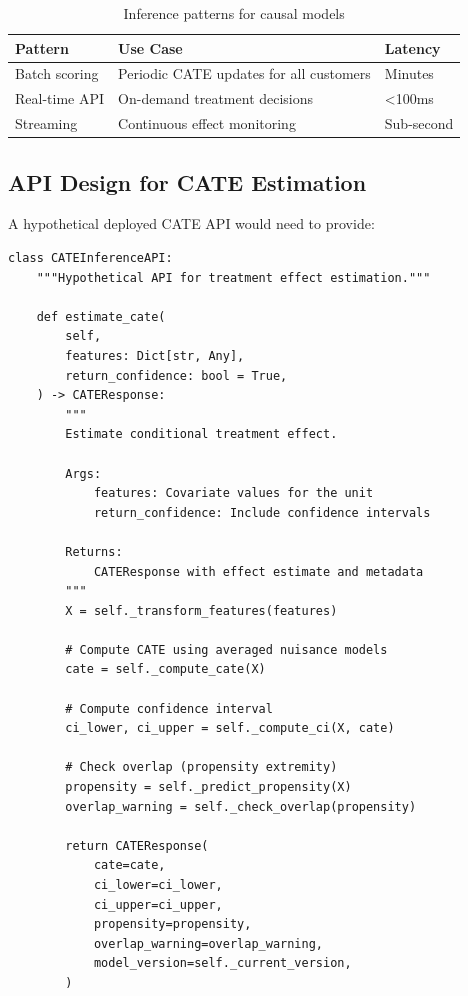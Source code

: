 \begin{table}[htbp]
\centering
\caption{Inference patterns for causal models}
\label{tab:inference_patterns}
\begin{tabular}{lll}
\toprule
\textbf{Pattern} & \textbf{Use Case} & \textbf{Latency} \\
\midrule
Batch scoring & Periodic CATE updates for all customers & Minutes \\
Real-time API & On-demand treatment decisions & <100ms \\
Streaming & Continuous effect monitoring & Sub-second \\
\bottomrule
\end{tabular}
\end{table}

\subsection{API Design for CATE Estimation}

A hypothetical deployed CATE API would need to provide:

\begin{verbatim}
class CATEInferenceAPI:
    """Hypothetical API for treatment effect estimation."""

    def estimate_cate(
        self,
        features: Dict[str, Any],
        return_confidence: bool = True,
    ) -> CATEResponse:
        """
        Estimate conditional treatment effect.

        Args:
            features: Covariate values for the unit
            return_confidence: Include confidence intervals

        Returns:
            CATEResponse with effect estimate and metadata
        """
        X = self._transform_features(features)

        # Compute CATE using averaged nuisance models
        cate = self._compute_cate(X)

        # Compute confidence interval
        ci_lower, ci_upper = self._compute_ci(X, cate)

        # Check overlap (propensity extremity)
        propensity = self._predict_propensity(X)
        overlap_warning = self._check_overlap(propensity)

        return CATEResponse(
            cate=cate,
            ci_lower=ci_lower,
            ci_upper=ci_upper,
            propensity=propensity,
            overlap_warning=overlap_warning,
            model_version=self._current_version,
        )
\end{verbatim}

